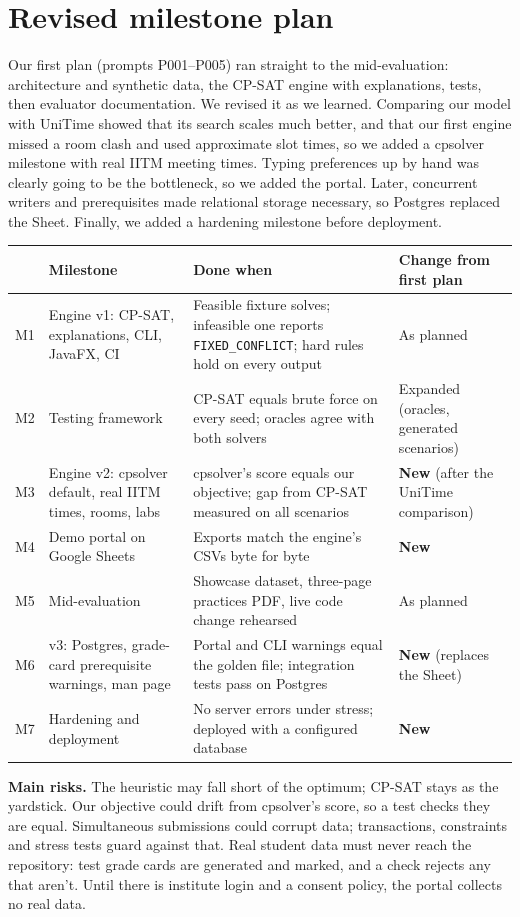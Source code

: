 \documentclass[10pt,a4paper]{article}
\newcommand{\code}[1]{\texttt{\small #1}}
\begin{document}
\section{Revised milestone plan}

Our first plan (prompts P001--P005) ran straight to the mid-evaluation: architecture and synthetic data, the CP-SAT engine with explanations, tests, then evaluator documentation. We revised it as we learned. Comparing our model with UniTime showed that its search scales much better, and that our first engine missed a room clash and used approximate slot times, so we added a cpsolver milestone with real IITM meeting times. Typing preferences up by hand was clearly going to be the bottleneck, so we added the portal. Later, concurrent writers and prerequisites made relational storage necessary, so Postgres replaced the Sheet. Finally, we added a hardening milestone before deployment.

\begin{tabularx}{\linewidth}{@{}L{8mm}L{37mm}Y L{24mm}@{}}
\toprule
& \textbf{Milestone} & \textbf{Done when} & \textbf{Change from first plan}\\
\midrule
M1 & Engine v1: CP-SAT, explanations, CLI, JavaFX, CI & Feasible fixture solves; infeasible one reports \code{FIXED\_CONFLICT}; hard rules hold on every output & As planned\\
M2 & Testing framework & CP-SAT equals brute force on every seed; oracles agree with both solvers & Expanded (oracles, generated scenarios)\\
M3 & Engine v2: cpsolver default, real IITM times, rooms, labs & cpsolver's score equals our objective; gap from CP-SAT measured on all scenarios & \textbf{New} (after the UniTime comparison)\\
M4 & Demo portal on Google Sheets & Exports match the engine's CSVs byte for byte & \textbf{New}\\
M5 & Mid-evaluation & Showcase dataset, three-page practices PDF, live code change rehearsed & As planned\\
M6 & v3: Postgres, grade-card prerequisite warnings, man page & Portal and CLI warnings equal the golden file; integration tests pass on Postgres & \textbf{New} (replaces the Sheet)\\
M7 & Hardening and deployment & No server errors under stress; deployed with a configured database & \textbf{New}\\
\bottomrule
\end{tabularx}

\vspace{2pt}
\textbf{Main risks.} The heuristic may fall short of the optimum; CP-SAT stays as the yardstick. Our objective could drift from cpsolver's score, so a test checks they are equal. Simultaneous submissions could corrupt data; transactions, constraints and stress tests guard against that. Real student data must never reach the repository: test grade cards are generated and marked, and a check rejects any that aren't. Until there is institute login and a consent policy, the portal collects no real data.
\end{document}
